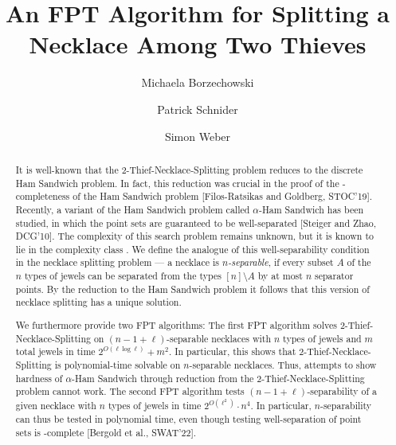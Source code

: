 \documentclass[a4paper,UKenglish,cleveref, thm-restate]{lipics-v2021}
\title{An FPT Algorithm for Splitting a Necklace Among Two Thieves}
\author{Michaela Borzechowski}{Department of Mathematics and Computer Science, Freie Universität Berlin, Germany}{michaela.borzechowski@fu-berlin.de}{}{DFG within the Research Training Group GRK~2434 \emph{Facets of Complexity}.}
\author{Patrick Schnider}{Department of Computer Science, ETH Zurich, Switzerland}{patrick.schnider@inf.ethz.ch}{https://orcid.org/0000-0002-2172-9285}{}
\author{Simon Weber}{Department of Computer Science, ETH Zurich, Switzerland}{simon.weber@inf.ethz.ch}{https://orcid.org/0000-0003-1901-3621}{Swiss National Science Foundation under project no. 204320.}
\begin{document}
\maketitle

\begin{abstract}
It is well-known that the 2-Thief-Necklace-Splitting problem reduces to the discrete Ham Sandwich problem. In fact, this reduction was crucial in the proof of the \PPA-completeness of the Ham Sandwich problem [Filos-Ratsikas and Goldberg, STOC'19]. Recently, a variant of the Ham Sandwich problem called $\alpha$-Ham Sandwich has been studied, in which the point sets are guaranteed to be well-separated [Steiger and Zhao, DCG'10]. The complexity of this search problem remains unknown, but it is known to lie in the complexity class . We define the analogue of this well-separability condition in the necklace splitting problem --- a necklace is \emph{$n$-separable}, if every subset $A$ of the $n$ types of jewels can be separated from the types $[n]\setminus A$ by at most $n$ separator points. By the reduction to the Ham Sandwich problem it follows that this version of necklace splitting has a unique solution.

We furthermore provide two FPT algorithms: The first FPT algorithm solves 2-Thief-Necklace-Splitting on $(n-1+\ell)$-separable necklaces with $n$ types of jewels and $m$ total jewels in time $2^{O(\ell\log\ell)}+m^2$. In particular, this shows that 2-Thief-Necklace-Splitting is polynomial-time solvable on $n$-separable necklaces. Thus, attempts to show hardness of $\alpha$-Ham Sandwich through reduction from the 2-Thief-Necklace-Splitting problem cannot work.
The second FPT algorithm tests $(n-1+\ell)$-separability of a given necklace with $n$ types of jewels in time $2^{O(\ell^2)}\cdot n^4$. In particular, $n$-separability can thus be tested in polynomial time, even though testing well-separation of point sets is \coNP-complete [Bergold et al., SWAT'22].
\end{abstract}
\end{document}
